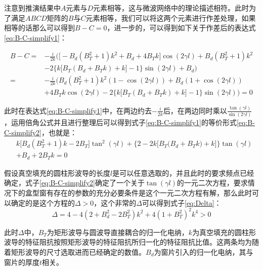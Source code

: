 \documentclass[master]{thesis-uestc}
\begin{document}
注意到推演结果中$A$元素与$D$元素相等，这与微波网络中的理论描述相符。此时为了满足$ABCD$矩阵的$B$与$C$元素相等，我们可以将这两个元素进行作差处理，如果相等的话那么可以得到$B-C=0$，进一步的，可以得到如下关于作差后的表达式\ref{eq:B-C-simplify1}：

\begin{equation}\label{eq:B-C-simplify1}
    \begin{split}
        B - C = & -\frac{i}{2k} \Bigg( \Big[-B_{d}(B_{T}^2 + 1)k^2 + B_{d} + 4B_{T}k\Big]\cos(2\gamma l) 
                  + B_{d}(B_{T}^2 + 1)k^2 \\
                & - 2\Big\{k\big[B_{T}(B_{d} + B_{T}k) + k\big] - 1\Big\}\sin(2\gamma l) 
                  + B_{d} \Bigg) \\
                = & -\frac{i}{2k} \Bigg(B_{d}(B_{T}^2 + 1)k^2(1-\cos(2\gamma l)) + B_{d}(1+\cos(2\gamma l)) \\
                & +4B_{T}k\cos(2\gamma l) - 2\Big\{k\big[B_{T}(B_{d} + B_{T}k) + k\big] - 1\Big\}\sin(2\gamma l) \Bigg) = 0
    \end{split}
\end{equation}

此时在表达式\ref{eq:B-C-simplify1}中，在两边约去$-\frac{i}{2k} $后，在两边同时乘以$\frac{\tan(\gamma l)}{\sin(2 \gamma l)}$，运用倍角公式并且进行整理后可以得到式子\ref{eq:B-C-simplify1}的等价形式\ref{eq:B-C-simplify2}，也就是：
\begin{equation}\label{eq:B-C-simplify2}
    \begin{split}
     & k \big[B_{d}(B_{T}^2+1)k - 2B_{T}\big]\tan^2(\gamma l) 
       + \Big\{ 2- 2k\Big[B_{T}\big(B_{d} + B_{T}k\big) + k\Big] \Big\}\tan(\gamma l) \\
    & + B_{d} + 2B_{T}k = 0
    \end{split}
\end{equation}

假设真空填充的圆柱形波导的长度$l$是可以任意选取的，并且此时的要求频点已经确定，式子\ref{eq:B-C-simplify2}确定了一个关于$\tan(\gamma l)$的一元二次方程，要求情况下的盒型窗有存在的参数的充分必要条件是这个一元二次方程有解，那么此时可以确定的是这个方程的$\Delta >0$，这个非常的$\Delta$可以得到式子\ref{eq:Delta}：
\begin{equation}\label{eq:Delta}
    \Delta = 4 - 4 (2 + B_{d}^2 - 2 B_{T}^2) k^2 + 4 (1 + B_{T}^2)^2 k^4>0
\end{equation}

此时$\Delta$中，$B_{T}$为矩形波导与圆波导直接耦合的归一化电纳，$k$为真空填充的圆柱形波导的特征阻抗按照矩形波导的特征阻抗所归一化的特征阻抗比值。这两条均为随着矩形波导的尺寸选取进而已经确定的数值。$B_{d}$为窗片引入的归一化电纳，其与窗片的厚度$t$相关。
\end{document}
